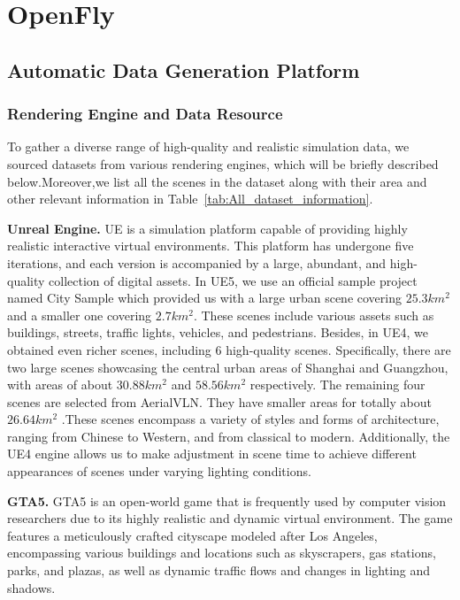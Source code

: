 \section{OpenFly}
\subsection{Automatic Data Generation Platform}

\subsubsection{Rendering Engine and Data Resource}
\indent \indent To gather a diverse range of high-quality and realistic simulation data, we sourced datasets from various rendering engines, which will be briefly described below.Moreover,we list all the scenes in the dataset along with their area and other relevant information in Table~\ref{tab:All_dataset_information}.

\textbf{Unreal Engine.} UE is a simulation platform capable of providing highly realistic interactive virtual environments. This platform has undergone five iterations, and each version is accompanied by a large, abundant, and high-quality collection of digital assets. In UE5, we use an official sample project named City Sample which provided us with a large urban scene covering $25.3 km^2$ and a smaller one covering $2.7 km^2$. These scenes include various assets such as buildings, streets, traffic lights, vehicles, and pedestrians. Besides, in UE4, we obtained even richer scenes, including 6 high-quality scenes. Specifically, there are two large scenes showcasing the central urban areas of Shanghai and Guangzhou, with areas of about $30.88 km^2$ and $58.56 km^2$ respectively. The remaining four scenes are selected from AerialVLN\cite{aerialVLN}. They have smaller areas for totally about $26.64 km^2$ .These scenes encompass a variety of styles and forms of architecture, ranging from Chinese to Western, and from classical to modern. Additionally, the UE4 engine allows us to make adjustment in scene time to achieve different appearances of scenes under varying lighting conditions.

\textbf{GTA5.} 
GTA5 is an open-world game that is frequently used by computer vision researchers due to its highly realistic and dynamic virtual environment.  The game features a meticulously crafted cityscape modeled after Los Angeles, encompassing various buildings and locations such as skyscrapers, gas stations, parks, and plazas, as well as dynamic traffic flows and changes in lighting and shadows.

